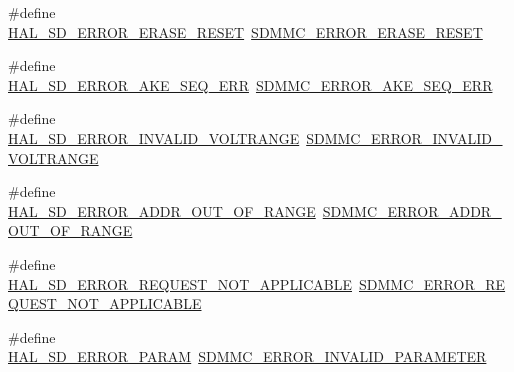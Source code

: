 \begin{DoxyCompactItemize}
\item 
\#define \mbox{\hyperlink{group___s_d___exported___constansts___group1_ga19b2efa8dd5dc56e216a4a46333fa263}{H\+A\+L\+\_\+\+S\+D\+\_\+\+E\+R\+R\+O\+R\+\_\+\+E\+R\+A\+S\+E\+\_\+\+R\+E\+S\+ET}}~\mbox{\hyperlink{group___s_d_m_m_c___l_l___exported___constants_gaf208ed8aeffac72703c252a9b9cfd5c1}{S\+D\+M\+M\+C\+\_\+\+E\+R\+R\+O\+R\+\_\+\+E\+R\+A\+S\+E\+\_\+\+R\+E\+S\+ET}}
\item 
\#define \mbox{\hyperlink{group___s_d___exported___constansts___group1_ga46e577fe48a24134d0d29361f9879e0a}{H\+A\+L\+\_\+\+S\+D\+\_\+\+E\+R\+R\+O\+R\+\_\+\+A\+K\+E\+\_\+\+S\+E\+Q\+\_\+\+E\+RR}}~\mbox{\hyperlink{group___s_d_m_m_c___l_l___exported___constants_gad7c5bc576a069a41207c7e89b556f1c7}{S\+D\+M\+M\+C\+\_\+\+E\+R\+R\+O\+R\+\_\+\+A\+K\+E\+\_\+\+S\+E\+Q\+\_\+\+E\+RR}}
\item 
\#define \mbox{\hyperlink{group___s_d___exported___constansts___group1_ga1e0173ebad6cf2b4cc72894c0756e2ff}{H\+A\+L\+\_\+\+S\+D\+\_\+\+E\+R\+R\+O\+R\+\_\+\+I\+N\+V\+A\+L\+I\+D\+\_\+\+V\+O\+L\+T\+R\+A\+N\+GE}}~\mbox{\hyperlink{group___s_d_m_m_c___l_l___exported___constants_ga885fc3b11e0689bd43fecc74bc6b30ad}{S\+D\+M\+M\+C\+\_\+\+E\+R\+R\+O\+R\+\_\+\+I\+N\+V\+A\+L\+I\+D\+\_\+\+V\+O\+L\+T\+R\+A\+N\+GE}}
\item 
\#define \mbox{\hyperlink{group___s_d___exported___constansts___group1_gaaf094e174892c74040b0c0251703fe53}{H\+A\+L\+\_\+\+S\+D\+\_\+\+E\+R\+R\+O\+R\+\_\+\+A\+D\+D\+R\+\_\+\+O\+U\+T\+\_\+\+O\+F\+\_\+\+R\+A\+N\+GE}}~\mbox{\hyperlink{group___s_d_m_m_c___l_l___exported___constants_gad0ef815d3f30eedca8e0c024f6f86726}{S\+D\+M\+M\+C\+\_\+\+E\+R\+R\+O\+R\+\_\+\+A\+D\+D\+R\+\_\+\+O\+U\+T\+\_\+\+O\+F\+\_\+\+R\+A\+N\+GE}}
\item 
\#define \mbox{\hyperlink{group___s_d___exported___constansts___group1_gad2441fc74676cb382d9b1c37f9d39eab}{H\+A\+L\+\_\+\+S\+D\+\_\+\+E\+R\+R\+O\+R\+\_\+\+R\+E\+Q\+U\+E\+S\+T\+\_\+\+N\+O\+T\+\_\+\+A\+P\+P\+L\+I\+C\+A\+B\+LE}}~\mbox{\hyperlink{group___s_d_m_m_c___l_l___exported___constants_gab601fdfd912c272721bec53d91269447}{S\+D\+M\+M\+C\+\_\+\+E\+R\+R\+O\+R\+\_\+\+R\+E\+Q\+U\+E\+S\+T\+\_\+\+N\+O\+T\+\_\+\+A\+P\+P\+L\+I\+C\+A\+B\+LE}}
\item 
\#define \mbox{\hyperlink{group___s_d___exported___constansts___group1_ga543eabd6783013497dc7036cabc34b68}{H\+A\+L\+\_\+\+S\+D\+\_\+\+E\+R\+R\+O\+R\+\_\+\+P\+A\+R\+AM}}~\mbox{\hyperlink{group___s_d_m_m_c___l_l___exported___constants_gad2596da9045aa0fdd81330548c4e4ff4}{S\+D\+M\+M\+C\+\_\+\+E\+R\+R\+O\+R\+\_\+\+I\+N\+V\+A\+L\+I\+D\+\_\+\+P\+A\+R\+A\+M\+E\+T\+ER}}

\end{DoxyCompactItemize}
